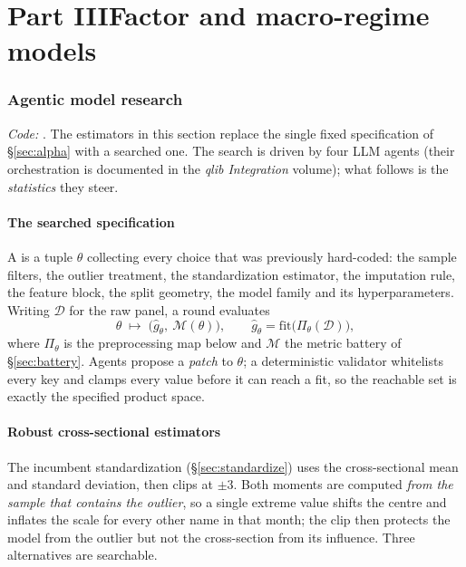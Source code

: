 \documentclass[11pt]{article}
\begin{document}
\part*{Part III\quad Factor and macro-regime models}

\section{Agentic model research}
\label{sec:research}

\emph{Code:} . The estimators in this section replace the
single fixed specification of \S\ref{sec:alpha} with a searched one. The search is
driven by four LLM agents (their orchestration is documented in the \emph{qlib
Integration} volume); what follows is the \emph{statistics} they steer.

\subsection{The searched specification}
A  is a tuple $\theta$ collecting every choice that was previously
hard-coded: the sample filters, the outlier treatment, the standardization estimator,
the imputation rule, the feature block, the split geometry, the model family and its
hyperparameters. Writing $\mathcal D$ for the raw panel, a round evaluates
\begin{equation}
  \theta \;\longmapsto\; \big(\hat g_\theta,\ \mathcal M(\theta)\big),
  \qquad
  \hat g_\theta = \text{fit}\big(\Pi_\theta(\mathcal D)\big),
\end{equation}
where $\Pi_\theta$ is the preprocessing map below and $\mathcal M$ the metric battery
of \S\ref{sec:battery}. Agents propose a \emph{patch} to $\theta$; a deterministic
validator whitelists every key and clamps every value before it can reach a fit, so
the reachable set is exactly the specified product space.

\subsection{Robust cross-sectional estimators}
The incumbent standardization (\S\ref{sec:standardize}) uses the cross-sectional mean
and standard deviation, then clips at $\pm3$. Both moments are computed \emph{from the
sample that contains the outlier}, so a single extreme value shifts the centre and
inflates the scale for every other name in that month; the clip then protects the
model from the outlier but not the cross-section from its influence. Three
alternatives are searchable.
\end{document}
